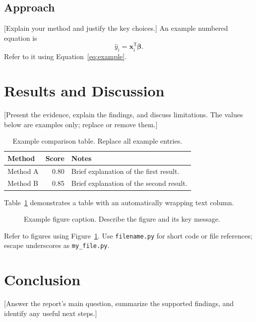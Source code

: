 \documentclass[11pt]{article}
\newcommand{\code}[1]{\texttt{#1}}
\begin{document}
\subsection{Approach}
[Explain your method and justify the key choices.]
An example numbered equation is
\begin{equation}
\widehat{y}_i = \bm{x}_i^{\mathsf T}\bm{\beta}.
\label{eq:example}
\end{equation}
Refer to it using Equation~\ref{eq:example}.

\section{Results and Discussion}
[Present the evidence, explain the findings, and discuss limitations.
The values below are examples only; replace or remove them.]

\begin{table}[htbp]
\centering
\caption{Example comparison table. Replace all example entries.}
\label{tab:example}
\small
\begin{tabularx}{\textwidth}{l r X}
\toprule
Method & Score & Notes \\
\midrule
Method A & 0.80 & Brief explanation of the first result. \\
Method B & 0.85 & Brief explanation of the second result. \\
\bottomrule
\end{tabularx}
\end{table}

Table~\ref{tab:example} demonstrates a table with an automatically
wrapping text column.

\begin{figure}[htbp]
\centering
\caption{Example figure caption. Describe the figure and its key message.}
\label{fig:example}
\end{figure}

Refer to figures using Figure~\ref{fig:example}. Use \code{filename.py}
for short code or file references; escape underscores as \code{my\_file.py}.

\section{Conclusion}
[Answer the report's main question, summarize the supported findings,
and identify any useful next steps.]
\end{document}
